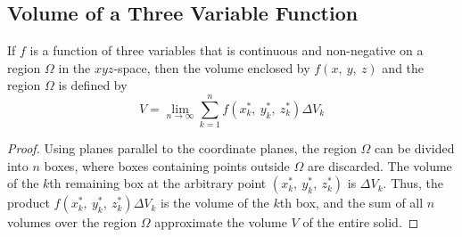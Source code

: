 \documentclass{article}
\begin{document}
\subsection{Volume of a Three Variable Function}
\begin{definition}
    If \(f\) is a function of three variables that is continuous and
    non-negative on a region \(\Omega\) in the \(xyz\)-space, then the
    volume enclosed by \(f\left( x,\: y, \: z \right)\) and the region \(\Omega\) is
    defined by
    \begin{equation}
        \label{eq:volume_of_3d_function}
        V = \lim_{n\to\infty} \sum_{k=1}^{n} f\left( x_k^\ast,\: y_k^\ast,\: z_k^\ast \right) \Delta V_k
    \end{equation}
\end{definition}
\begin{proof}
    Using planes parallel to the coordinate planes, the region
    \(\Omega\) can be divided into \(n\) boxes, where boxes containing
    points outside \(\Omega\) are discarded. The volume of the
    \(k\)th remaining box at the arbitrary point
    \(\left( x_k^\ast,\: y_k^\ast,\: z_k^\ast \right)\) is \(\Delta V_k\). Thus, the
    product \(f\left( x_k^\ast,\: y_k^\ast,\: z_k^\ast \right)\Delta V_k\) is the
    volume of the \(k\)th box, and the sum of all \(n\) volumes over the
    region \(\Omega\) approximate the volume \(V\) of the entire solid.
\end{proof}
\end{document}
